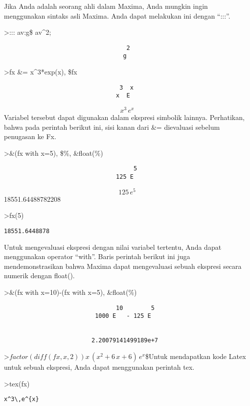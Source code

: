 \documentclass[
]{book}
\begin{document}
Jika Anda adalah seorang ahli dalam Maxima, Anda mungkin ingin menggunakan sintaks asli Maxima. Anda dapat melakukan ini dengan ``:::''.

\textgreater::: av:g\$ av\^{}2;

\begin{verbatim}
                                   2
                                  g
\end{verbatim}

\textgreater fx \&= x\^{}3*exp(x), \$fx

\begin{verbatim}
                                 3  x
                                x  E
\end{verbatim}

\[x^3\,e^{x}\]Variabel tersebut dapat digunakan dalam ekspresi simbolik lainnya. Perhatikan, bahwa pada perintah berikut ini, sisi kanan dari \&= dievaluasi sebelum penugasan ke Fx.

\textgreater\&(fx with x=5), \$\%, \&float(\%)

\begin{verbatim}
                                     5
                                125 E
\end{verbatim}

\[125\,e^5\] 18551.64488782208

\textgreater fx(5)

\begin{verbatim}
18551.6448878
\end{verbatim}

Untuk mengevaluasi ekspresi dengan nilai variabel tertentu, Anda dapat menggunakan operator ``with''. Baris perintah berikut ini juga mendemonstrasikan bahwa Maxima dapat mengevaluasi sebuah ekspresi secara numerik dengan float().

\textgreater\&(fx with x=10)-(fx with x=5), \&float(\%)

\begin{verbatim}
                                10        5
                          1000 E   - 125 E


                         2.20079141499189e+7
\end{verbatim}

\textgreater{}\(factor(diff(fx,x,2))\)\(x\,\left(x^2+6\,x+6\right)\,e^{x}\)\$Untuk mendapatkan kode Latex untuk sebuah ekspresi, Anda dapat menggunakan perintah tex.

\textgreater tex(fx)

\begin{verbatim}
x^3\,e^{x}
\end{verbatim}
\end{document}
